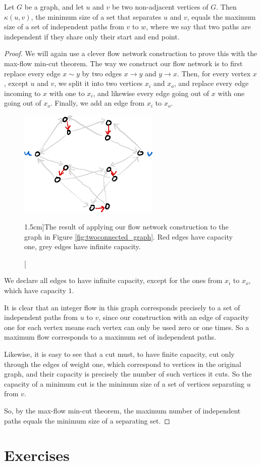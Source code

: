\documentclass[nobib]{tufte-handout}
\begin{document}
\begin{theorem}[Menger]
  Let $G$ be a graph, and let $u$ and $v$ be two non-adjacent vertices of $G$. Then $\kappa(u,v)$, the minimum size of a set that separates $u$ and $v$, equals the maximum size of a set of independent paths from $v$ to $w$, where we say that two paths are independent if they share only their start and end point.

  \begin{proof}
    We will again use a clever flow network construction to prove this with the max-flow min-cut theorem. The way we construct our flow network is to first replace every edge $x\sim y$ by two edges $x\to y$ and $y\to x$. Then, for every vertex $x$, except $u$ and $v$, we split it into two vertices $x_i$ and $x_o$, and replace every edge incoming to $x$ with one to $x_i$, and likewise every edge going out of $x$ with one going out of $x_o$. Finally, we add an edge from $x_i$ to $x_o$.

    \begin{figure}
      \centering
      \includegraphics[width=0.6\textwidth]{graphics/L10_connectivity/menger_theorem_construction.png}
      \caption[][1.5cm]{The result of applying our flow network construction to the graph in Figure \ref{fig:twoconnected_graph}. Red edges have capacity one, grey edges have infinite capacity.}
      \label{fig:menger_thm_construction}
    \end{figure}

    We declare all edges to have infinite capacity, except for the ones from $x_i$ to $x_o$, which have capacity $1$.

    It is clear that an integer flow in this graph corresponds precisely to a set of independent paths from $u$ to $v$, since our construction with an edge of capacity one for each vertex means each vertex can only be used zero or one times. So a maximum flow corresponds to a maximum set of independent paths.

    Likewise, it is easy to see that a cut must, to have finite capacity, cut only through the edges of weight one, which correspond to vertices in the original graph, and their capacity is precisely the number of such vertices it cuts. So the capacity of a minimum cut is the minimum size of a set of vertices separating $u$ from $v$.

    So, by the max-flow min-cut theorem, the maximum number of independent paths equals the minimum size of a separating set.
  \end{proof}
\end{theorem}

\section{Exercises}


%
%
\end{document}
